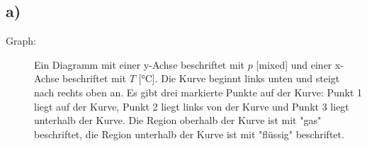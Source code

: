 

\subsection*{a)}

\begin{description}
    \item[Graph:] Ein Diagramm mit einer y-Achse beschriftet mit \( p \) [mixed] und einer x-Achse beschriftet mit \( T \) [°C]. Die Kurve beginnt links unten und steigt nach rechts oben an. Es gibt drei markierte Punkte auf der Kurve: Punkt 1 liegt auf der Kurve, Punkt 2 liegt links von der Kurve und Punkt 3 liegt unterhalb der Kurve. Die Region oberhalb der Kurve ist mit "gas" beschriftet, die Region unterhalb der Kurve ist mit "flüssig" beschriftet.
\end{description}